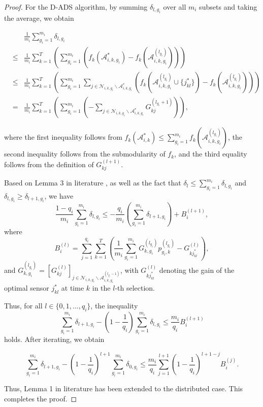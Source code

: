 \begin{proof}
For the D-ADS algorithm, by summing $\delta_{l,g_i}$ over all $m_i$ subsets and taking the average, we obtain

\begin{small}
    \begin{eqnarray}\label{delta_lp_relax}
&&\frac{1}{m_i}\sum^{m_i}_{g_i=1}\delta_{l,g_i} \nonumber\\
&\le&\frac{1}{m_i}\sum^T_{k=1}(\sum^{m_i}_{g_i=1}(f_k(\mathcal{A}_{i,k,g_i}^{*})-f_k(\mathcal{A}_{i,k,g_i}^{(l_{g_i})}))) \nonumber \\
&\le& \frac{1}{m_i}\sum_{k=1}^T (\sum^{m_i}_{g_i=1} \sum_{j\in \mathcal{N}_{i,k,g_i}\backslash\mathcal{A}_{i,k,g_i}^*} ( f_k(\mathcal{A}_{i,k,g_i}^{(l_{g_i})}\cup \{j_{kl}^*\})-f_k(\mathcal{A}_{i,k,g_i}^{(l_{g_i})}) )) \nonumber \\
&=& \frac{1}{m_i}\sum_{k=1}^T (  \sum^{m_i}_{g_i=1} ( -\sum_{j \in \mathcal{N}_{i,k,g_i}\backslash\mathcal{A}_{i,k,g_i}^*}G_{kj}^{(l_{g_i}+1)} ) ),
\end{eqnarray}
\end{small}

\!\!where the first inequality follows from $f_k(\mathcal{A}_{i,k}^{*}) \le \sum^{m_i}_{g_i=1}f_k(\mathcal{A}_{i,k,g_i}^{(l_{g_i})})$, the second inequality follows from the submodularity of $f_k$, and the third equality follows from the definition of $G_{kj}^{(l+1)}$.  

Based on Lemma 3 in literature \cite{matsuoka2021tracking}, as well as the fact that $\delta_l \le \sum^{m_i}_{g_i=1} \delta_{l,g_i}$ and $\delta_{l,g_i} \ge \delta_{l+1,g_i}$, we have
\[
\frac{1-q_i}{m_i}\sum^{m_i}_{g_i=1}\delta_{l,g_i} \le -\frac{q_i}{m_i} \left( \sum^{m_i}_{g_i=1} \delta_{l+1,g_i} \right) + B^{(l+1)}_i,
\]
where
\[
B^{(l)}_i = \sum_{j=1}^{q_i}\sum_{k=1}^T \left( \frac{1}{m_i}\sum^{m_i}_{g_i=1} G_{k,g_i}^{(l_{g_i})} p_{g_i,k}^{(l_{g_i})} - G_{kj_{kl}^{*}}^{(l)} \right),
\]
and $G_{k,g_i}^{(l_{g_i})} = [ G_{kj}^{(l)} ]_{j \in \mathcal{N}_{i,k,g_i} \backslash \mathcal{A}_{i,k,g_i}^{(l_{g_i}-1)}}$, with $G_{kj_{kl}^{*}}^{(l)}$ denoting the gain of the optimal sensor $j_{kl}^{*}$ at time $k$ in the $l$-th selection. 

Thus, for all $l \in \{0, 1, ..., q_i\}$, the inequality 
\[
\sum^{m_i}_{g_i=1} \delta_{l+1,g_i} - \left(1 - \frac{1}{q_i} \right) \sum^{m_i}_{g_i=1} \delta_{l,g_i} \le \frac{m_i}{q_i} B_i^{(l+1)}
\]
holds. After iterating, we obtain
\begin{small}
\begin{equation}\label{relationship}
   \sum^{m_i}_{g_i=1} \delta_{l+1,g_i} - \left( 1 - \frac{1}{q_i} \right)^{l+1} \sum^{m_i}_{g_i=1} \delta_{0,g_i} \le \frac{m_i}{q_i} \sum_{j=1}^{l+1} \left( 1 - \frac{1}{q_i} \right)^{l+1-j} B_i^{(j)}. 
\end{equation}
\end{small}
Thus, Lemma 1 in literature \cite{Suo2024Security} has been extended to the distributed case.
This completes the proof.
\end{proof}


